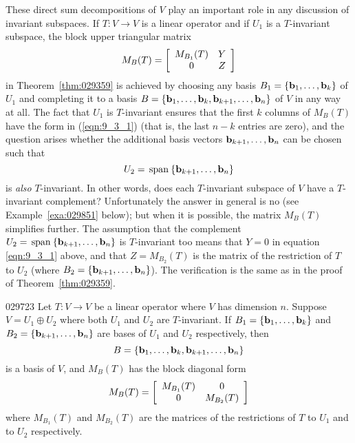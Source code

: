 These direct sum decompositions of $V$ play an important role in any discussion of invariant subspaces. If $T : V \to V$ is a linear operator and if $U_{1}$ is a $T$-invariant subspace, the block upper triangular matrix
\begin{equation}\label{eqn:9_3_1}
M_B(T) = \left[ \begin{array}{cc} M_{B_1}(T) & Y \\ 0 & Z \end{array} \right]
\end{equation}
in Theorem~\ref{thm:029359} is achieved by choosing any basis $B_{1} = \{\textbf{b}_{1}, \dots, \textbf{b}_{k}\}$ of $U_{1}$ and completing it to a basis $B = \{\textbf{b}_{1}, \dots, \textbf{b}_{k}, \textbf{b}_{k+1}, \dots, \textbf{b}_{n}\}$ of $V$ in any way at all. The fact that $U_{1}$ is $T$-invariant ensures that the first $k$ columns of $M_{B}(T)$ have the form in (\ref{eqn:9_3_1}) (that is, the last $n - k$ entries are zero), and the question arises whether the additional basis vectors $\textbf{b}_{k+1}, \dots, \textbf{b}_{n}$ can be chosen such that
\begin{equation*}
U_2 = \thinspace\operatorname{span \medspace}\{\textbf{b}_{k+1}, \dots, \textbf{b}_n\}
\end{equation*}
is \textit{also} $T$-invariant. In other words, does each $T$-invariant subspace of $V$ have a $T$-invariant complement? Unfortunately the answer in general is no (see Example~\ref{exa:029851} below); but when it is possible, the matrix $M_{B}(T)$ simplifies further. The assumption that the complement $U_{2} = \thinspace\operatorname{span\medspace}\{\textbf{b}_{k+1}, \dots, \textbf{b}_{n}\}$ is $T$-invariant too means that $Y = 0$ in equation \ref{eqn:9_3_1} above, and that $Z = M_{B_{2}}(T)$ is the matrix of the restriction of $T$ to $U_{2}$ (where $B_{2} = \{\textbf{b}_{k+1}, \dots, \textbf{b}_{n}\}$). The verification is the same as in the proof of Theorem~\ref{thm:029359}.


\begin{theorem}{}{029723}
Let $T : V \to V$ be a linear operator where $V$ has dimension $n$. Suppose $V = U_{1} \oplus U_{2}$ where both $U_{1}$ and $U_{2}$ are $T$-invariant. If $B_{1} = \{\textbf{b}_{1}, \dots, \textbf{b}_{k}\}$ and $B_{2} = \{\textbf{b}_{k+1}, \dots, \textbf{b}_{n}\}$ are bases of $U_{1}$ and $U_{2}$ respectively, then
\begin{equation*}
B = \{\textbf{b}_1, \dots, \textbf{b}_k, \textbf{b}_{k+1}, \dots, \textbf{b}_n\}
\end{equation*}
is a basis of $V$, and $M_{B}(T)$ has the block diagonal form
\begin{equation*}
M_B(T) = \left[ \begin{array}{cc} M_{B_1}(T) & 0 \\ 0 & M_{B_2}(T) \end{array} \right]
\end{equation*}
where $M_{B_{1}}(T)$ and $M_{B_{2}}(T)$ are the matrices of the restrictions of $T$ to $U_{1}$ and to $U_{2}$ respectively.
\end{theorem}

